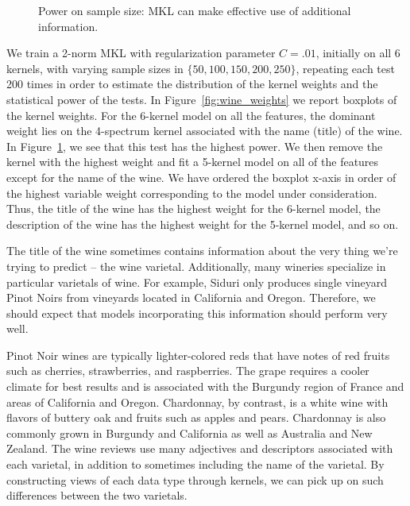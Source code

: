 \begin{figure}
  \begin{center}
    \resizebox{14.0cm}{!}{
      
    }
  \end{center}
\caption{Power on sample size: MKL can make effective use of
  additional information.}
\label{fig:wine_power}
\end{figure}

We train a 2-norm MKL with regularization parameter $C=.01$, initially
on all 6 kernels, with varying sample sizes in $\{50, 100, 150, 200,
250\}$, repeating each test 200 times in order to estimate the
distribution of the kernel weights and the statistical power of the
tests.  In Figure~\ref{fig:wine_weights} we report boxplots of the
kernel weights.  For the 6-kernel model on all the features, the dominant
weight lies on the 4-spectrum kernel associated with the name (title)
of the wine.  In Figure~\ref{fig:wine_power}, we see that this test
has the highest power.  We then remove the kernel with the highest
weight and fit a 5-kernel model on all of the features except for the
name of the wine.  We have ordered the boxplot x-axis in order of
the highest variable weight corresponding to the model under
consideration.  Thus, the title of the wine has the highest weight
for the 6-kernel model, the description of the wine has the highest
weight for the 5-kernel model, and so on.

The title of the wine sometimes contains information about the very
thing we're trying to predict -- the wine varietal.  Additionally,
many wineries specialize in particular varietals of wine.  For
example, Siduri only produces single vineyard Pinot Noirs from
vineyards located in California and Oregon.  Therefore, we should
expect that models incorporating this information should perform very
well.

Pinot Noir wines are typically lighter-colored reds that have notes of
red fruits such as cherries, strawberries, and raspberries.  The grape
requires a cooler climate for best results and is associated with the
Burgundy region of France and areas of California and Oregon.
Chardonnay, by contrast, is a white wine with flavors of buttery oak
and fruits such as apples and pears.  Chardonnay is also commonly
grown in Burgundy and California as well as Australia and New
Zealand.  The wine reviews use many adjectives and descriptors
associated with each varietal, in addition to sometimes including the
name of the varietal.  By constructing views of each data type through
kernels, we can pick up on such differences between the two varietals.

